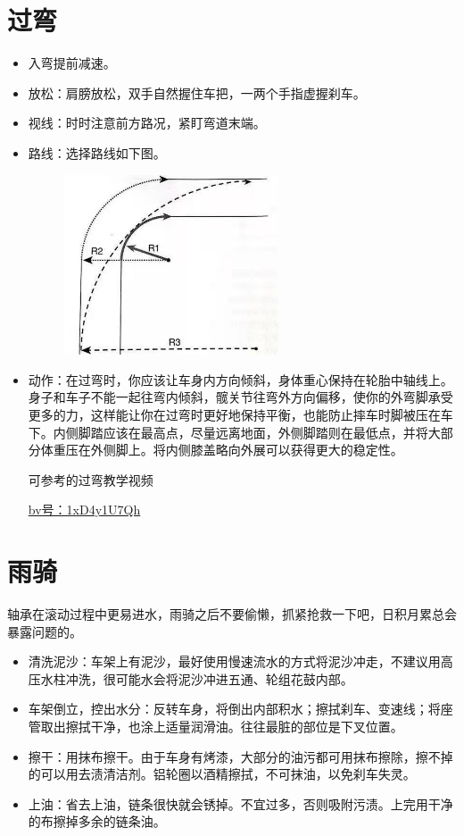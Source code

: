 \documentclass{ctexbook}
\begin{document}
\section{过弯}
\begin{itemize}
\item 入弯提前减速。
\item 放松：肩膀放松，双手自然握住车把，一两个手指虚握刹车。
\item 视线：时时注意前方路况，紧盯弯道末端。 
\item 路线：选择路线如下图。
       \begin{figure}[H]
            \begin{center}
            \includegraphics[width=0.6\textwidth]{fig/过弯}
            \end{center}
        \end{figure}
\item 动作：在过弯时，你应该让车身内方向倾斜，身体重心保持在轮胎中轴线上。身子和车子不能一起往弯内倾斜，髋关节往弯外方向偏移，使你的外弯脚承受更多的力，这样能让你在过弯时更好地保持平衡，也能防止摔车时脚被压在车下。内侧脚踏应该在最高点，尽量远离地面，外侧脚踏则在最低点，并将大部分体重压在外侧脚上。将内侧膝盖略向外展可以获得更大的稳定性。

可参考的过弯教学视频 

\href{https://www.bilibili.com/video/BV1xD4y1U7Qh}{bv号：1xD4y1U7Qh}
\end{itemize}

\section{雨骑}
轴承在滚动过程中更易进水，雨骑之后不要偷懒，抓紧抢救一下吧，日积月累总会暴露问题的。
\begin{itemize}
\item 清洗泥沙：车架上有泥沙，最好使用慢速流水的方式将泥沙冲走，不建议用高压水柱冲洗，很可能水会将泥沙冲进五通、轮组花鼓内部。
\item 车架倒立，控出水分：反转车身，将倒出内部积水；擦拭刹车、变速线；将座管取出擦拭干净，也涂上适量润滑油。往往最脏的部位是下叉位置。 
\item 擦干：用抹布擦干。由于车身有烤漆，大部分的油污都可用抹布擦除，擦不掉的可以用去渍清洁剂。铝轮圈以酒精擦拭，不可抹油，以免刹车失灵。
\item 上油：省去上油，链条很快就会锈掉。不宜过多，否则吸附污渍。上完用干净的布擦掉多余的链条油。
\end{itemize}
\end{document}
